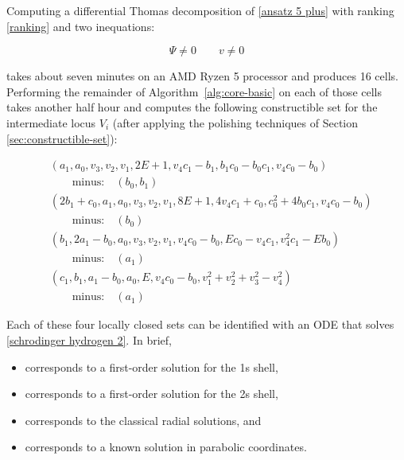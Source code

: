 \documentclass{article}
\theoremstyle{definition}
\theoremstyle{plain}
\begin{document}
Computing a differential Thomas decomposition of \eqref{ansatz 5 plus} with ranking \eqref{ranking} and two inequations:

\begin{equation}
\Psi \ne 0 \qquad v \ne 0
\end{equation}

takes about seven minutes
on an AMD Ryzen 5 processor and produces 16 cells.  Performing the remainder of Algorithm~\ref{alg:core-basic}
on each of those cells takes another half hour and computes the following constructible set
for the intermediate locus $V_i$ (after applying the polishing techniques of Section \ref{sec:constructible-set}):

\begin{subequations}
\label{ideal}
\begin{align}
& \left(a_{1}, a_{0}, v_{3}, v_{2}, v_{1}, 2 E + 1, v_{4} c_{1} - b_{1}, b_{1} c_{0} - b_{0} c_{1}, v_{4} c_{0} - b_{0}\right)\label{ideal:1s} \\
& \qquad\text{minus:}\quad \left(b_{0}, b_{1}\right) \nonumber \\
& \left(2 b_{1} + c_{0}, a_{1}, a_{0}, v_{3}, v_{2}, v_{1}, 8 E + 1, 4 v_{4} c_{1} + c_{0}, c_{0}^{2} + 4 b_{0} c_{1}, v_{4} c_{0} - b_{0}\right)\label{ideal:2s} \\
& \qquad\text{minus:}\quad \left(b_{0}\right) \nonumber \\
& \left(b_{1}, 2 a_{1} - b_{0}, a_{0}, v_{3}, v_{2}, v_{1}, v_{4} c_{0} - b_{0}, E c_{0} - v_{4} c_{1}, v_{4}^{2} c_{1} - E b_{0}\right)\label{ideal:classical} \\
& \qquad\text{minus:}\quad \left(a_{1}\right) \nonumber \\
& \left(c_{1}, b_{1}, a_{1} - b_{0}, a_{0}, E, v_{4} c_{0} - b_{0}, v_{1}^{2} + v_{2}^{2} + v_{3}^{2} - v_{4}^{2}\right)\label{ideal:parabolic} \\
& \qquad\text{minus:}\quad \left(a_{1}\right) \nonumber
\end{align}
\end{subequations}

Each of these four locally closed sets can be identified with an ODE that solves \eqref{schrodinger hydrogen 2}.
In brief,

\begin{itemize}
\item[\eqref{ideal:1s}] corresponds to a first-order solution for the 1s shell,
\item[\eqref{ideal:2s}] corresponds to a first-order solution for the 2s shell,
\item[\eqref{ideal:classical}] corresponds to the classical radial solutions, and
\item[\eqref{ideal:parabolic}] corresponds to a known solution in parabolic coordinates.
\end{itemize}
\end{document}
